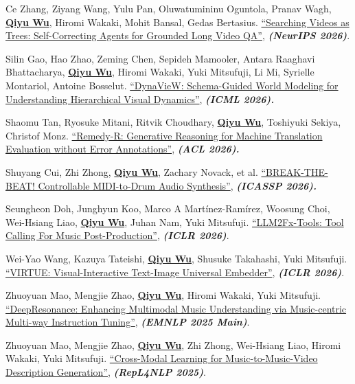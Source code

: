 \documentclass[10pt, letterpaper]{article}
\begin{document}
      \begin{description}[leftmargin=3.5em,labelwidth=3em,labelsep=0.5em,topsep=0.10cm,itemsep=0.10cm,parsep=0pt]
        \item [{[C11]}] Ce Zhang, Ziyang Wang, Yulu Pan, Oluwatumininu Oguntola, Pranav Wagh, \underline{\textbf{Qiyu Wu}}, Hiromi Wakaki, Mohit Bansal, Gedas Bertasius. \href{https://arxiv.org/abs/2607.16189}{``Searching Videos as Trees: Self-Correcting Agents for Grounded Long Video QA''}, \textit{\textbf{(NeurIPS 2026)}}.
        \item [{[C10]}] Silin Gao, Hao Zhao, Zeming Chen, Sepideh Mamooler, Antara Raaghavi Bhattacharya, \underline{\textbf{Qiyu Wu}}, Hiromi Wakaki, Yuki Mitsufuji, Li Mi, Syrielle Montariol, Antoine Bosselut. \href{https://arxiv.org/abs/2607.04112}{``DynaVieW: Schema-Guided World Modeling for Understanding Hierarchical Visual Dynamics''}, \textit{\textbf{(ICML 2026).}}
        \item [{[C9]}] Shaomu Tan, Ryosuke Mitani, Ritvik Choudhary, \underline{\textbf{Qiyu Wu}}, Toshiyuki Sekiya, Christof Monz. \href{https://arxiv.org/abs/2512.18906}{``Remedy-R: Generative Reasoning for Machine Translation Evaluation without Error Annotations''}, \textit{\textbf{(ACL 2026).}}
        \item [{[C8]}] Shuyang Cui, Zhi Zhong, \underline{\textbf{Qiyu Wu}}, Zachary Novack, et al. \href{https://arxiv.org/abs/2605.14555}{``BREAK-THE-BEAT! Controllable MIDI-to-Drum Audio Synthesis''}, \textbf{\textit{(ICASSP 2026).}}
        \item [{[C7]}] Seungheon Doh, Junghyun Koo, Marco A Martínez-Ramírez, Woosung Choi, Wei-Hsiang Liao, \underline{\textbf{Qiyu Wu}}, Juhan Nam, Yuki Mitsufuji. \href{https://arxiv.org/abs/2512.01559}{``LLM2Fx-Tools: Tool Calling For Music Post-Production''}, \textit{\textbf{(ICLR 2026)}}.
        \item [{[C6]}] Wei-Yao Wang, Kazuya Tateishi, \underline{\textbf{Qiyu Wu}}, Shusuke Takahashi, Yuki Mitsufuji. \href{https://arxiv.org/abs/2510.00523}{``VIRTUE: Visual-Interactive Text-Image Universal Embedder''}, \textit{\textbf{(ICLR 2026)}}.
        \item [{[C5]}] Zhuoyuan Mao, Mengjie Zhao, \underline{\textbf{Qiyu Wu}}, Hiromi Wakaki, Yuki Mitsufuji. \href{https://aclanthology.org/2025.emnlp-main.653/}{``DeepResonance: Enhancing Multimodal Music Understanding via Music-centric Multi-way Instruction Tuning''}, \textit{\textbf{(EMNLP 2025 Main)}}.
        \item [{[C4]}] Zhuoyuan Mao, Mengjie Zhao, \underline{\textbf{Qiyu Wu}}, Zhi Zhong, Wei-Hsiang Liao, Hiromi Wakaki, Yuki Mitsufuji. \href{https://aclanthology.org/2025.repl4nlp-1.4/}{``Cross-Modal Learning for Music-to-Music-Video Description Generation''}, \textit{\textbf{(RepL4NLP 2025)}}.

\end{description}
\end{document}
